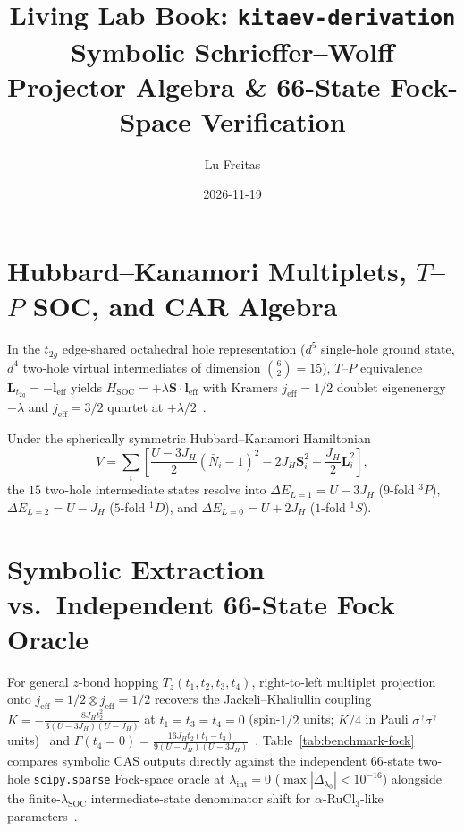 \documentclass[11pt,oneside]{memoir}
\title{\textbf{Living Lab Book: \texttt{kitaev-derivation}}\\
\large Symbolic Schrieffer--Wolff Projector Algebra \& 66-State Fock-Space Verification}
\author{Lu Freitas}
\date{2026-11-19}
\begin{document}
\maketitle
\tableofcontents*

\chapter{Hubbard--Kanamori Multiplets, \texorpdfstring{$T$--$P$}{T-P} SOC, and CAR Algebra}

In the $t_{2g}$ edge-shared octahedral hole representation ($d^5$ single-hole ground state, $d^4$ two-hole virtual intermediates of dimension $\binom{6}{2}=15$), $T$--$P$ equivalence $\mathbf{L}_{t_{2g}} = -\mathbf{l}_{\mathrm{eff}}$ yields $H_{\mathrm{SOC}} = +\lambda \mathbf{S}\cdot\mathbf{l}_{\mathrm{eff}}$ with Kramers $j_{\mathrm{eff}}=1/2$ doublet eigenenergy $-\lambda$ and $j_{\mathrm{eff}}=3/2$ quartet at $+\lambda/2$~\cite{Jackeli2009}.

Under the spherically symmetric Hubbard--Kanamori Hamiltonian
\begin{equation}
  V = \sum_i \left[\frac{U-3J_H}{2}(\bar{N}_i - 1)^2 - 2J_H\mathbf{S}_i^2 - \frac{J_H}{2}\mathbf{L}_i^2\right],
\end{equation}
the $15$ two-hole intermediate states resolve into $\Delta E_{L=1} = U - 3J_H$ ($9$-fold $^3P$), $\Delta E_{L=2} = U - J_H$ ($5$-fold $^1D$), and $\Delta E_{L=0} = U + 2J_H$ ($1$-fold $^1S$).

\chapter{Symbolic Extraction vs.\ Independent 66-State Fock Oracle}

For general $z$-bond hopping $T_z(t_1,t_2,t_3,t_4)$, right-to-left multiplet projection onto $j_{\mathrm{eff}}=1/2 \otimes j_{\mathrm{eff}}=1/2$ recovers the Jackeli--Khaliullin coupling $K = -\frac{8 J_H t_2^2}{3(U-3J_H)(U-J_H)}$ at $t_1=t_3=t_4=0$ (spin-$1/2$ units; $K/4$ in Pauli $\sigma^\gamma\sigma^\gamma$ units)~\cite{Jackeli2009} and $\Gamma(t_4=0) = \frac{16 J_H t_2 (t_1 - t_3)}{9(U-J_H)(U-3J_H)}$~\cite{RauLeeKee2014}. Table~\ref{tab:benchmark-fock} compares symbolic CAS outputs directly against the independent $66$-state two-hole \texttt{scipy.sparse} Fock-space oracle at $\lambda_{\mathrm{int}}=0$ ($\max|\Delta_{\lambda_0}| < 10^{-16}$) alongside the finite-$\lambda_{\mathrm{SOC}}$ intermediate-state denominator shift for $\alpha$-RuCl$_3$-like parameters~\cite{Winter2016}.
\end{document}
